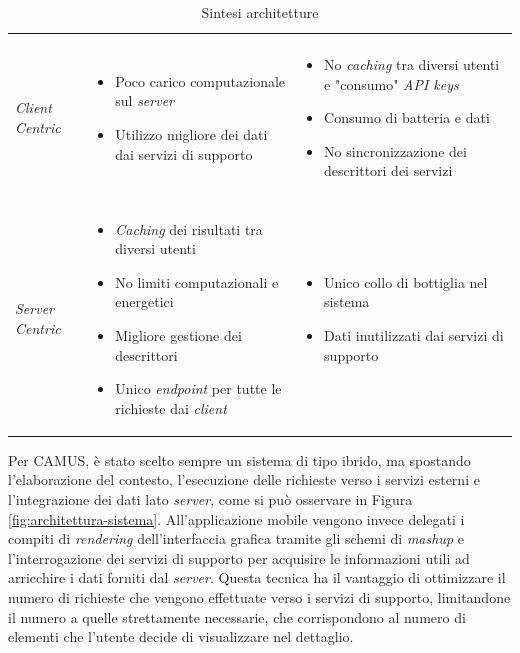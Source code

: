 \begin{table}[ht]
	\caption{Sintesi architetture}
	\label{table:sintesi_architetturei}
	\begin{tabularx}{\textwidth}{lXX}
		\toprule
		\thead{Architettura} & \thead{PROs} & \thead{CONs} \\
		\midrule
		\\ \emph{Client Centric} & 
		\vspace{-6.8mm}
		\begin{itemize}
			\item Poco carico computazionale sul \emph{server}
			\item Utilizzo migliore dei dati dai servizi di supporto
		\end{itemize} &
		\vspace{-6.8mm}
		\begin{itemize}
			\item No \emph{caching} tra diversi utenti e "consumo" \emph{API keys}
			\item Consumo di batteria e dati
			\item No sincronizzazione dei descrittori dei servizi
		\end{itemize} \\
		\hline
		\\ \emph{Server Centric} &
		\vspace{-6.8mm}
		\begin{itemize}
			\item \emph{Caching} dei risultati tra diversi utenti
			\item No limiti computazionali e energetici
			\item Migliore gestione dei descrittori
			\item Unico \emph{endpoint} per tutte le richieste dai \emph{client}
		\end{itemize} &
		\vspace{-6.8mm}
		\begin{itemize}
			\item Unico collo di bottiglia nel sistema
			\item Dati inutilizzati dai servizi di supporto
		\end{itemize}
		\\
		\bottomrule
	\end{tabularx}
\end{table}

Per CAMUS, è stato scelto sempre un sistema di tipo ibrido, ma spostando l'elaborazione del contesto, l'esecuzione delle richieste verso i servizi esterni e l'integrazione dei dati lato \emph{server}, come si può osservare in Figura \ref{fig:architettura-sistema}. All'ap\-pli\-ca\-zio\-ne mobile vengono invece delegati i compiti di \emph{rendering} dell'interfaccia grafica tramite gli schemi di \emph{mashup} e l'interrogazione dei servizi di supporto per acquisire le informazioni utili ad arricchire i dati forniti dal \emph{server}. Questa tecnica ha il vantaggio di ottimizzare il numero di richieste che vengono effettuate verso i servizi di supporto, limitandone il numero a quelle strettamente necessarie, che corrispondono al numero di elementi che l'utente decide di visualizzare nel dettaglio.

